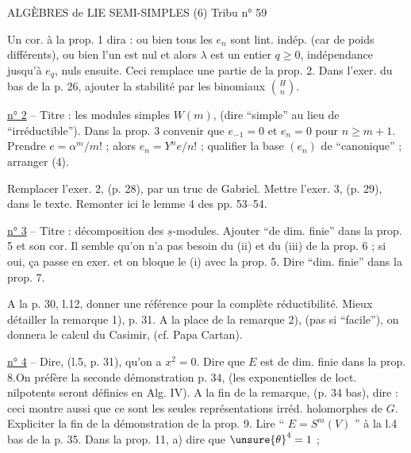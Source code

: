 ALGÈBRES de LIE SEMI-SIMPLES (6) \hfill Tribu n° 59

Un cor. à la prop. 1 dira : ou bien tous les $e_n$ sont lint. indép. (car de poids différents), ou bien l'un est nul et alors $\lambda$ est un entier $q\geq 0$, indépendance jusqu'à $e_q$, nuls ensuite. Ceci remplace une partie de la prop. 2. Dans l'exer. du bas de la p. 26, ajouter la stabilité par les binomiaux $\binom Hn$.

\uline{n° 2} -- Titre : les modules simples $W(m)$, (dire ``simple'' au lieu de ``irréductible''). Dans la prop. 3 convenir que $e_{-1}=0$ et $e_n=0$ pour $n\geq m+1$. Prendre $e=\alpha^m/m!$ ; alors $e_n=Y^ne/n!$ ; qualifier la base $(e_n)$ de ``canonique'' ; arranger (4).

Remplacer l'exer. 2, (p. 28), par un truc de Gabriel. Mettre l'exer. 3, (p. 29), dans le texte. Remonter ici le lemme 4 des pp. 53--54.

\uline{n° 3} -- Titre : décomposition des $\underline s$-modules. Ajouter ``de dim. finie'' dans la prop. 5 et son cor. Il semble qu'on n'a pas besoin du (ii) et du (iii) de la prop. 6 ; si oui, ça passe en exer. et on bloque le (i) avec la prop. 5. Dire ``dim. finie'' dans la prop. 7.

A la p. 30, l.12, donner une référence pour la complète réductibilité. Mieux détailler la remarque 1), p. 31. A la place de la remarque 2), (pas si ``facile''), on donnera le calcul du Casimir, (cf. Papa Cartan).

\uline{n° 4} -- Dire, (l.5, p. 31), qu'on a $x^2=0$. Dire que $E$ est de dim. finie dans la prop. 8.On préfère la seconde démonstration p. 34, (les exponentielles de loct. nilpotents seront définies en Alg. IV). A la fin de la remarque, (p. 34 bas), dire : ceci montre aussi que ce sont les seules représentations irréd. holomorphes de $G$. Expliciter la fin de la démonstration de la prop. 9. Lire `` $E=S^m(V)$ '' à la l.4 bas de la p. 35. Dans la prop. 11, a) dire que $\unsure{\theta}^4=1$ ;
